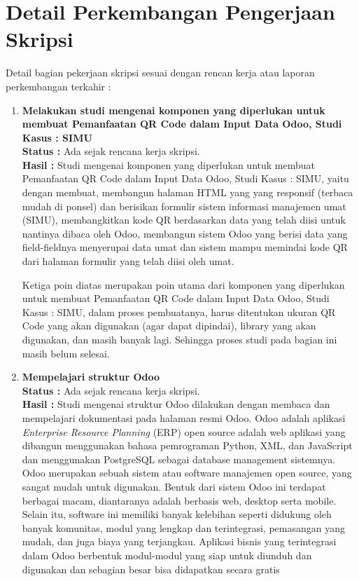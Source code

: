 \documentclass[a4paper,twoside]{article}
\begin{document}
\section{Detail Perkembangan Pengerjaan Skripsi}
Detail bagian pekerjaan skripsi sesuai dengan rencan kerja atau laporan perkembangan terkahir :
	\begin{enumerate}
		\item \textbf{Melakukan studi mengenai komponen yang diperlukan untuk membuat Pemanfaatan QR Code dalam Input Data Odoo, Studi Kasus : SIMU}\\
		{\bf Status :} Ada sejak rencana kerja skripsi.\\
		{\bf Hasil :} Studi mengenai komponen yang diperlukan untuk membuat Pemanfaatan QR Code dalam Input Data Odoo, Studi Kasus : SIMU, yaitu dengan membuat, membangun halaman HTML yang yang responsif (terbaca mudah di ponsel) dan berisikan formulir sistem informasi manajemen umat (SIMU), membangkitkan kode QR berdasarkan data yang telah diisi untuk nantinya dibaca oleh Odoo, membangun sistem Odoo yang berisi data yang field-fieldnya menyerupai data umat dan sistem mampu memindai kode QR dari halaman formulir yang telah diisi oleh umat.
		
		Ketiga poin diatas merupakan poin utama dari komponen yang diperlukan untuk membuat Pemanfaatan QR Code dalam Input Data Odoo, Studi Kasus : SIMU, dalam proses pembuatanya, harus ditentukan ukuran QR Code yang akan digunakan (agar dapat dipindai), library yang akan digunakan, dan masih banyak lagi. Sehingga proses studi pada bagian ini masih belum selesai.
		
		\item \textbf{Mempelajari struktur Odoo}\\
		{\bf Status :} Ada sejak rencana kerja skripsi.\\
		{\bf Hasil :} Studi mengenai struktur Odoo dilakukan dengan membaca dan mempelajari dokumentasi pada halaman resmi Odoo. Odoo adalah aplikasi \textit{Enterprise Resource Planning} (ERP) open source adalah web aplikasi yang dibangun menggunakan bahasa pemrograman Python, XML, dan JavaScript dan menggunakan PostgreSQL sebagai database management sistemnya.  Odoo merupakan sebuah sistem atau software manajemen open source, yang sangat mudah untuk digunakan. Bentuk dari sistem Odoo ini terdapat berbagai macam, diantaranya adalah berbasis web, desktop serta mobile. Selain itu, software ini memiliki banyak kelebihan seperti didukung oleh banyak komunitas, modul yang lengkap dan terintegrasi, pemasangan yang mudah, dan juga biaya yang terjangkau. Aplikasi bisnis yang terintegrasi dalam Odoo berbentuk modul-modul yang siap untuk diunduh dan digunakan dan sebagian besar bisa didapatkan secara gratis


\end{enumerate}
\end{document}
